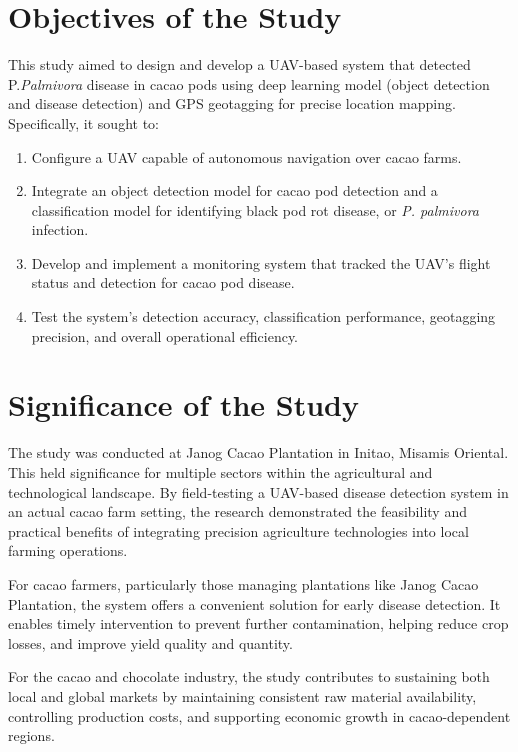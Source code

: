 {\section{Objectives of the Study}

This study aimed to design and develop a UAV-based system that detected P.\textit{Palmivora} disease in cacao pods using deep learning model (object detection and disease detection) and GPS geotagging for precise location mapping. Specifically, it sought to:

\begin{enumerate}
	\item Configure a UAV capable of autonomous navigation over cacao farms.
	\item Integrate an object detection model for cacao pod detection and a classification model for identifying black pod rot disease, or \textit{P. palmivora} infection.
	\item Develop and implement a monitoring system that tracked the UAV’s flight status and detection for cacao pod disease.
	\item Test the system’s detection accuracy, classification performance, geotagging precision, and overall operational efficiency.
\end{enumerate}

\section{Significance of the Study}
The study was conducted at Janog Cacao Plantation in Initao, Misamis Oriental. This held significance for multiple sectors within the agricultural and technological landscape. By field-testing a UAV-based disease detection system in an actual cacao farm setting, the research demonstrated the feasibility and practical benefits of integrating precision agriculture technologies into local farming operations.

For cacao farmers, particularly those managing plantations like Janog Cacao Plantation, the system offers a convenient solution for early disease detection. It enables timely intervention to prevent further contamination, helping reduce crop losses, and improve yield quality and quantity.

For the cacao and chocolate industry, the study contributes to sustaining both local and global markets by maintaining consistent raw material availability, controlling production costs, and supporting economic growth in cacao-dependent regions.

}

